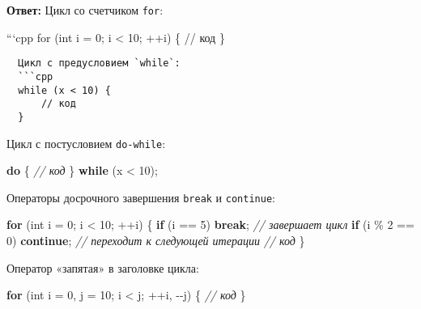 \documentclass[
]{article}
\newenvironment{Shaded}{}{}
\newcommand{\CommentTok}[1]{\textcolor[rgb]{0.38,0.63,0.69}{\textit{#1}}}
\newcommand{\ControlFlowTok}[1]{\textcolor[rgb]{0.00,0.44,0.13}{\textbf{#1}}}
\newcommand{\DataTypeTok}[1]{\textcolor[rgb]{0.56,0.13,0.00}{#1}}
\newcommand{\DecValTok}[1]{\textcolor[rgb]{0.25,0.63,0.44}{#1}}
\newcommand{\NormalTok}[1]{#1}
\newcommand{\OperatorTok}[1]{\textcolor[rgb]{0.40,0.40,0.40}{#1}}
\begin{document}
\begin{enumerate}
  \textbf{Ответ:} Цикл со счетчиком \texttt{for}:

  ```cpp for (int i = 0; i \textless{} 10; ++i) \{ // код \}
\end{enumerate}

\begin{verbatim}
  Цикл с предусловием `while`:
  ```cpp
  while (x < 10) {
      // код
  }
\end{verbatim}

Цикл с постусловием \texttt{do-while}:

\begin{Shaded}
\begin{Highlighting}[]
\ControlFlowTok{do} \OperatorTok{\{}
    \CommentTok{// код}
\OperatorTok{\}} \ControlFlowTok{while} \OperatorTok{(}\NormalTok{x }\OperatorTok{\textless{}} \DecValTok{10}\OperatorTok{);}
\end{Highlighting}
\end{Shaded}

Операторы досрочного завершения \texttt{break} и \texttt{continue}:

\begin{Shaded}
\begin{Highlighting}[]
\ControlFlowTok{for} \OperatorTok{(}\DataTypeTok{int}\NormalTok{ i }\OperatorTok{=} \DecValTok{0}\OperatorTok{;}\NormalTok{ i }\OperatorTok{\textless{}} \DecValTok{10}\OperatorTok{;} \OperatorTok{++}\NormalTok{i}\OperatorTok{)} \OperatorTok{\{}
    \ControlFlowTok{if} \OperatorTok{(}\NormalTok{i }\OperatorTok{==} \DecValTok{5}\OperatorTok{)} \ControlFlowTok{break}\OperatorTok{;} \CommentTok{// завершает цикл}
    \ControlFlowTok{if} \OperatorTok{(}\NormalTok{i }\OperatorTok{\%} \DecValTok{2} \OperatorTok{==} \DecValTok{0}\OperatorTok{)} \ControlFlowTok{continue}\OperatorTok{;} \CommentTok{// переходит к следующей итерации}
    \CommentTok{// код}
\OperatorTok{\}}
\end{Highlighting}
\end{Shaded}

Оператор «запятая» в заголовке цикла:

\begin{Shaded}
\begin{Highlighting}[]
\ControlFlowTok{for} \OperatorTok{(}\DataTypeTok{int}\NormalTok{ i }\OperatorTok{=} \DecValTok{0}\OperatorTok{,}\NormalTok{ j }\OperatorTok{=} \DecValTok{10}\OperatorTok{;}\NormalTok{ i }\OperatorTok{\textless{}}\NormalTok{ j}\OperatorTok{;} \OperatorTok{++}\NormalTok{i}\OperatorTok{,} \OperatorTok{{-}{-}}\NormalTok{j}\OperatorTok{)} \OperatorTok{\{}
    \CommentTok{// код}
\OperatorTok{\}}
\end{Highlighting}
\end{Shaded}
\end{document}
